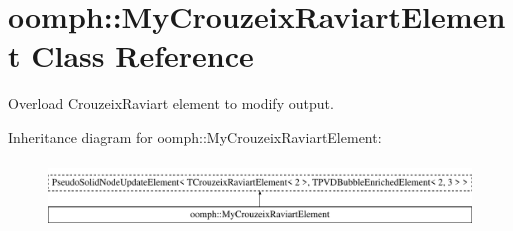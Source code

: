 \hypertarget{classoomph_1_1MyCrouzeixRaviartElement}{}\section{oomph\+:\+:My\+Crouzeix\+Raviart\+Element Class Reference}
\label{classoomph_1_1MyCrouzeixRaviartElement}


Overload Crouzeix\+Raviart element to modify output.  


Inheritance diagram for oomph\+:\+:My\+Crouzeix\+Raviart\+Element\+:\begin{figure}[H]
\begin{center}
\leavevmode
\includegraphics[height=1.800643cm]{classoomph_1_1MyCrouzeixRaviartElement}
\end{center}
\end{figure}
